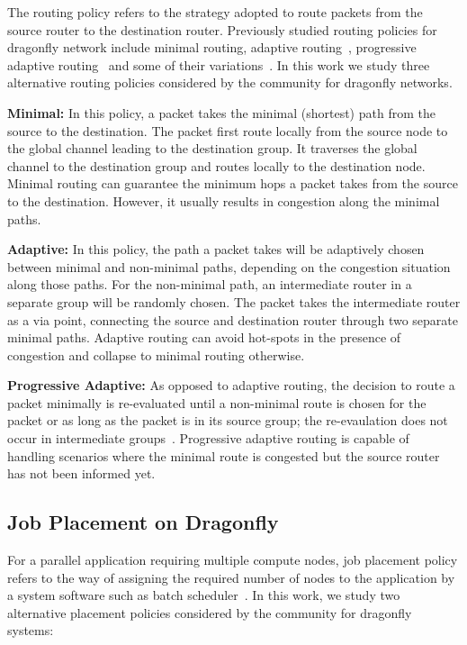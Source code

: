 The routing policy refers to the strategy adopted to route  packets from the source router to the destination router. Previously studied routing policies for dragonfly network include minimal routing, adaptive routing~\cite{dally-dragonfly}, progressive adaptive routing~\cite{jiang} and some of their variations~\cite{won-prog-adaptive}. In this work we study three alternative routing policies considered by the community for dragonfly networks.

\textbf{Minimal:} In this policy, a packet takes the minimal (shortest) path from the source to the destination. The packet first route locally from the source node to the global channel leading to the destination group. It traverses the global channel to the destination group and routes locally to the destination node. 
Minimal routing can guarantee the minimum hops a packet takes from the source to the destination. However, it usually results in congestion along the minimal paths. 

\textbf{Adaptive:} In this policy, the path a packet takes will be adaptively chosen between minimal and non-minimal paths, depending on the congestion situation along those paths. For the non-minimal path, an intermediate router in a separate group will be randomly chosen. The packet takes the intermediate router as a via point, connecting the source and destination router through two separate minimal paths. Adaptive routing can avoid hot-spots in the presence of congestion and collapse to minimal routing otherwise. 

\textbf{Progressive Adaptive:} As opposed to adaptive routing, the decision to route a packet minimally is re-evaluated until a non-minimal route is chosen for the packet or as long as the packet is in its source group; the re-evaulation does not occur in intermediate groups~\cite{jiang}.
Progressive adaptive routing is capable of handling scenarios where the minimal route is congested but the source router has not been informed yet.




\subsection{Job Placement on Dragonfly}
\label{sec:placement-schemes}

For a parallel application requiring multiple compute nodes, job placement policy refers to the way of assigning the required number of nodes to the application by a system software such as batch scheduler~\cite{xu-cluster14}. In this work, we study two alternative placement policies considered by the community for dragonfly systems: 

